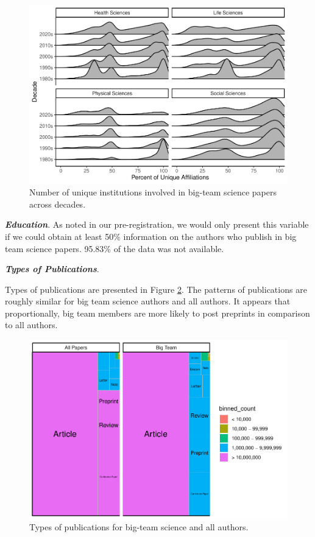 \documentclass[
  man,floatsintext]{apa6}
\begin{document}
\begin{figure}
\centering
\includegraphics{manuscript_scopus_files/figure-latex/fig-inst-1.pdf}
\caption{\label{fig:fig-inst}Number of unique institutions involved in big-team science papers across decades.}
\end{figure}

\textbf{\emph{Education}}. As noted in our pre-registration, we would only present this variable if we could obtain at least 50\% information on the authors who publish in big team science papers. 95.83\% of the data was not available.

\textbf{\emph{Types of Publications}}.

Types of publications are presented in Figure \ref{fig:fig-pub-types}. The patterns of publications are roughly similar for big team science authors and all authors. It appears that proportionally, big team members are more likely to post preprints in comparison to all authors.

\begin{figure}
\centering
\includegraphics{manuscript_scopus_files/figure-latex/fig-pub-types-1.pdf}
\caption{\label{fig:fig-pub-types}Types of publications for big-team science and all authors.}
\end{figure}
\end{document}
